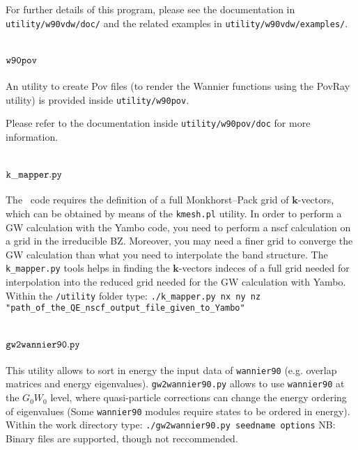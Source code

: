 For further details of this program, please see the documentation
in \verb|utility/w90vdw/doc/| and the related examples in
\verb|utility/w90vdw/examples/|.

\section{$\tt{w90pov}$}
\label{sec:w90pov}

An utility to create Pov files (to render the Wannier functions using
the PovRay utility) is provided inside \verb|utility/w90pov|.

Please refer to the documentation inside \verb|utility/w90pov/doc|
for more information.


\section{$\tt{k\_mapper.py}$}
\label{sec:k_mapper}
The \wannier\ code requires the definition of a full Monkhorst--Pack
grid of $\mathbf{k}$-vectors, which can be obtained by means of the \verb|kmesh.pl| utility.
In order to perform a GW calculation with the Yambo code, you need to perform a nscf calculation on a grid in the irreducible BZ. Moreover, you may need a finer grid to converge the GW calculation than what you need to interpolate the band structure. The \verb|k_mapper.py| tools helps in finding the $\mathbf{k}$-vectors indeces of a full grid needed for interpolation into the reduced grid needed for the GW calculation with Yambo. \newline \newline
Within the \verb|/utility| folder type:\newline 
\verb|./k_mapper.py nx ny nz "path_of_the_QE_nscf_output_file_given_to_Yambo"|
\section{$\tt{gw2wannier90.py}$}
This utility allows to sort in energy the input data of \verb|wannier90| (e.g. overlap matrices and energy eigenvalues). \verb|gw2wannier90.py| allows to use \verb|wannier90| at the $G_0W_0$ level, where quasi-particle corrections can change the energy ordering of eigenvalues (Some \verb|wannier90| modules require states to be ordered in energy).\newline \newline
Within the work directory type:
\verb|./gw2wannier90.py seedname options|
\newline \newline
NB: Binary files are supported, though not reccommended.
\label{sec:w90aaa}


